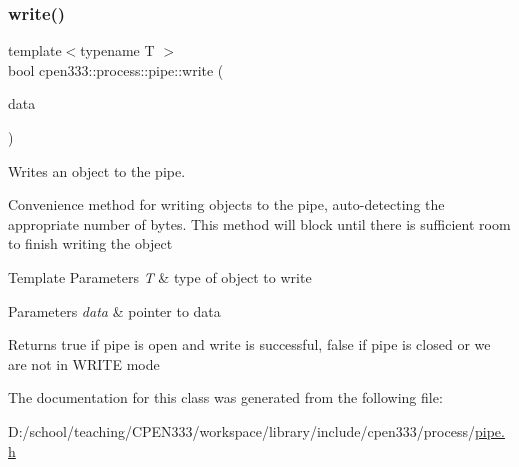 \subsubsection{\texorpdfstring{write()}{write()}\hspace{0.1cm}{\footnotesize\ttfamily [3/3]}}
{\footnotesize\ttfamily template$<$typename T $>$ \\
bool cpen333\+::process\+::pipe\+::write (\begin{DoxyParamCaption}\item[{const T $\ast$}]{data }\end{DoxyParamCaption})\hspace{0.3cm}{\ttfamily [inline]}}



Writes an object to the pipe. 

Convenience method for writing objects to the pipe, auto-\/detecting the appropriate number of bytes. This method will block until there is sufficient room to finish writing the object


\begin{DoxyTemplParams}{Template Parameters}
{\em T} & type of object to write \\
\hline
\end{DoxyTemplParams}

\begin{DoxyParams}{Parameters}
{\em data} & pointer to data \\
\hline
\end{DoxyParams}
\begin{DoxyReturn}{Returns}
true if pipe is open and write is successful, false if pipe is closed or we are not in W\+R\+I\+TE mode 
\end{DoxyReturn}


The documentation for this class was generated from the following file\+:\begin{DoxyCompactItemize}
\item 
D\+:/school/teaching/\+C\+P\+E\+N333/workspace/library/include/cpen333/process/\hyperlink{pipe_8h}{pipe.\+h}\end{DoxyCompactItemize}

